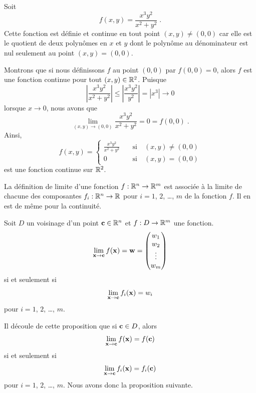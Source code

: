 {\begin{egg}
Soit
\[
f(x,y) = \frac{x^3y^2}{x^2+y^2} \; .
\]
Cette fonction est définie et continue en tout point $(x,y)\neq (0,0)$
car elle est le quotient de deux polynômes en $x$ et $y$ dont le
polynôme au dénominateur est nul seulement au point $(x,y) = (0,0)$.

Montrons que si nous définissons $f$ au point $(0,0)$ par $f(0,0)=0$, alors
$f$ est une fonction continue pour tout $(x,y)\in \mathbb{R}^2$. Puisque
\[
\left| \frac{x^3y^2}{x^2+y^2} \right| \leq
\left| \frac{x^3y^2}{y^2} \right| = |x^3| \rightarrow 0
\]
lorsque $x\rightarrow 0$, nous avons que
\[
\lim_{(x,y)\rightarrow (0,0)} \frac{x^3y^2}{x^2+y^2} = 0 = f(0,0) \; .
\]
Ainsi,
\[
f(x,y) = \begin{cases}
\displaystyle \frac{x^3y^2}{x^2+y^2} & \quad \text{si} \quad (x,y)\neq (0,0) \\
0 & \quad \text{si} \quad (x,y)= (0,0)
\end{cases}
\]
est une fonction continue sur $\mathbb{R}^2$.
\end{egg}


La définition de limite d'une fonction $f:\mathbb{R}^n \rightarrow \mathbb{R}^m$ est
associée à la limite de chacune des composantes
$f_i:\mathbb{R}^n\rightarrow \mathbb{R}$ pour $i=1$, $2$, \ldots, $m$ de la fonction
$f$.  Il en est de même pour la continuité.

\begin{prop}
Soit $D$ un voisinage d'un point $\mathbf{c} \in \mathbb{R}^n$ et
$f:D\rightarrow \mathbb{R}^m$ une fonction.
\[
\lim_{\mathbf{x}\rightarrow \mathbf{c}} f(\mathbf{x}) = \mathbf{w} =
\begin{pmatrix} w_1 \\ w_2 \\ \vdots \\ w_m \end{pmatrix}
\]
si et seulement si
\[
\lim_{\mathbf{x}\rightarrow \mathbf{c}} f_i(\mathbf{x}) = w_i
\]
pour $i=1$, $2$, \ldots, $m$.
\end{prop}

Il découle de cette proposition que si $\mathbf{c} \in D$, alors
\[
\lim_{\mathbf{x}\rightarrow \mathbf{c}} f(\mathbf{x}) = f(\mathbf{c})
\]
si et seulement si
\[
\lim_{\mathbf{x}\rightarrow \mathbf{c}} f_i(\mathbf{x}) = f_i(\mathbf{c})
\]
pour $i=1$, $2$, \ldots, $m$.  Nous avons donc la proposition suivante.

}
